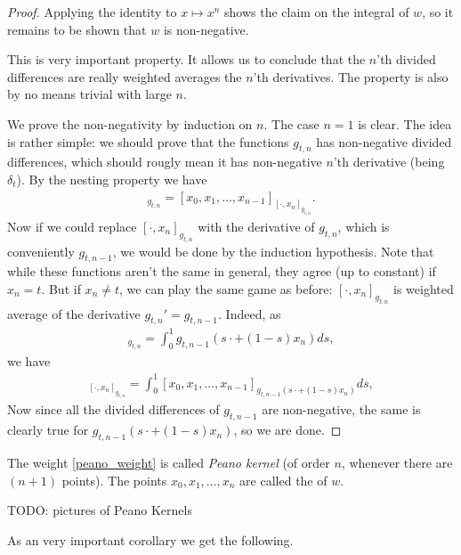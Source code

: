 \begin{proof}
	Applying the identity to $x \mapsto x^{n}$ shows the claim on the integral of $w$, so it remains to be shown that $w$ is non-negative.

	This is very important property. It allows us to conclude that the $n$'th divided differences are really weighted averages the $n$'th derivatives. The property is also by no means trivial with large $n$.

	We prove the non-negativity by induction on $n$. The case $n = 1$ is clear. The idea is rather simple: we should prove that the functions $g_{t, n}$ has non-negative divided differences, which should rougly mean it has non-negative $n$'th derivative (being $\delta_{t}$). By the nesting property we have
	\begin{align*}
		[x_{0}, x_{1}, \ldots, x_{n}]_{g_{t, n}} = [x_{0}, x_{1}, \ldots, x_{n - 1}]_{[\cdot, x_{n}]_{g_{t, n}}}.
	\end{align*}
	Now if we could replace $[\cdot, x_{n}]_{g_{t, n}}$ with the derivative of $g_{t, n}$, which is conveniently $g_{t, n - 1}$, we would be done by the induction hypothesis. Note that while these functions aren't the same in general, they agree (up to constant) if $x_{n} = t$. But if $x_{n} \neq t$, we can play the same game as before: $[\cdot, x_{n}]_{g_{t, n}}$ is weighted average of the derivative $g_{t, n}' = g_{t, n - 1}$. Indeed, as
	\begin{align*}
		[\cdot, x_{n}]_{g_{t, n}} = \int_{0}^{1} g_{t, n - 1}(s \cdot + (1 - s) x_{n}) ds,
	\end{align*}
	we have
	\begin{align*}
		[x_{0}, x_{1}, \ldots, x_{n}]_{[\cdot, x_{n}]_{g_{t, n}}} = \int_{0}^{1} [x_{0}, x_{1}, \ldots, x_{n - 1}]_{g_{t, n - 1}(s \cdot + (1 - s) x_{n})} ds,
	\end{align*}
	Now since all the divided differences of $g_{t, n - 1}$ are non-negative, the same is clearly true for $g_{t, n - 1}(s \cdot + (1 - s) x_{n})$, so we are done.
\end{proof}

The weight \ref{peano_weight} is called \textit{Peano kernel} (of order $n$, whenever there are $(n + 1)$ points). The points $x_{0}, x_{1}, \ldots, x_{n}$ are called the  of $w$.

TODO: pictures of Peano Kernels

As an very important corollary we get the following.

